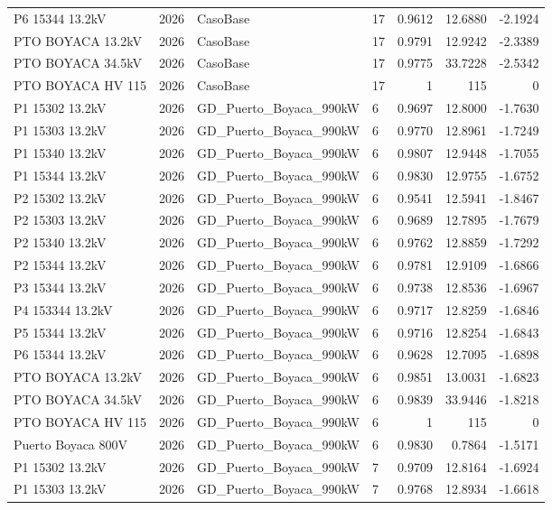 \documentclass[11pt,a4paper]{article}
\begin{document}
\begin{longtable}{llllrrr}
P6 15344 13.2kV & 2026 & CasoBase & 17 & 0.9612 & 12.6880 & -2.1924 \\
PTO BOYACA 13.2kV & 2026 & CasoBase & 17 & 0.9791 & 12.9242 & -2.3389 \\
PTO BOYACA 34.5kV & 2026 & CasoBase & 17 & 0.9775 & 33.7228 & -2.5342 \\
PTO BOYACA HV 115 & 2026 & CasoBase & 17 & 1 & 115 & 0 \\
P1 15302 13.2kV & 2026 & GD\_Puerto\_Boyaca\_990kW & 6 & 0.9697 & 12.8000 & -1.7630 \\
P1 15303 13.2kV & 2026 & GD\_Puerto\_Boyaca\_990kW & 6 & 0.9770 & 12.8961 & -1.7249 \\
P1 15340 13.2kV & 2026 & GD\_Puerto\_Boyaca\_990kW & 6 & 0.9807 & 12.9448 & -1.7055 \\
P1 15344 13.2kV & 2026 & GD\_Puerto\_Boyaca\_990kW & 6 & 0.9830 & 12.9755 & -1.6752 \\
P2 15302 13.2kV & 2026 & GD\_Puerto\_Boyaca\_990kW & 6 & 0.9541 & 12.5941 & -1.8467 \\
P2 15303 13.2kV & 2026 & GD\_Puerto\_Boyaca\_990kW & 6 & 0.9689 & 12.7895 & -1.7679 \\
P2 15340 13.2kV & 2026 & GD\_Puerto\_Boyaca\_990kW & 6 & 0.9762 & 12.8859 & -1.7292 \\
P2 15344 13.2kV & 2026 & GD\_Puerto\_Boyaca\_990kW & 6 & 0.9781 & 12.9109 & -1.6866 \\
P3 15344 13.2kV & 2026 & GD\_Puerto\_Boyaca\_990kW & 6 & 0.9738 & 12.8536 & -1.6967 \\
P4 153344 13.2kV & 2026 & GD\_Puerto\_Boyaca\_990kW & 6 & 0.9717 & 12.8259 & -1.6846 \\
P5 15344 13.2kV & 2026 & GD\_Puerto\_Boyaca\_990kW & 6 & 0.9716 & 12.8254 & -1.6843 \\
P6 15344 13.2kV & 2026 & GD\_Puerto\_Boyaca\_990kW & 6 & 0.9628 & 12.7095 & -1.6898 \\
PTO BOYACA 13.2kV & 2026 & GD\_Puerto\_Boyaca\_990kW & 6 & 0.9851 & 13.0031 & -1.6823 \\
PTO BOYACA 34.5kV & 2026 & GD\_Puerto\_Boyaca\_990kW & 6 & 0.9839 & 33.9446 & -1.8218 \\
PTO BOYACA HV 115 & 2026 & GD\_Puerto\_Boyaca\_990kW & 6 & 1 & 115 & 0 \\
Puerto Boyaca 800V & 2026 & GD\_Puerto\_Boyaca\_990kW & 6 & 0.9830 & 0.7864 & -1.5171 \\
P1 15302 13.2kV & 2026 & GD\_Puerto\_Boyaca\_990kW & 7 & 0.9709 & 12.8164 & -1.6924 \\
P1 15303 13.2kV & 2026 & GD\_Puerto\_Boyaca\_990kW & 7 & 0.9768 & 12.8934 & -1.6618 \\

\end{longtable}
\end{document}
